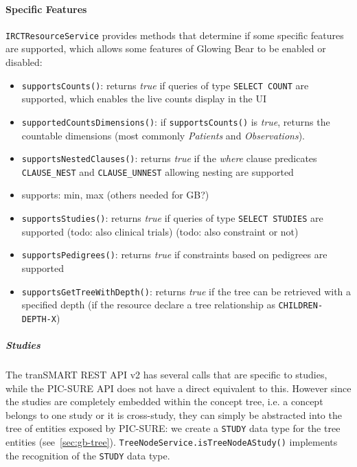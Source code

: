\paragraph{Specific Features}
\verb|IRCTResourceService| provides methods that determine if some specific features are supported, which allows some features of Glowing Bear to be enabled or disabled:
\begin{itemize}
    \item \verb|supportsCounts()|: returns \emph{true} if queries of type \verb|SELECT COUNT| are supported, which enables the live counts display in the UI
    \item \verb|supportedCountsDimensions()|: if \verb|supportsCounts()| is \emph{true}, returns the countable dimensions (most commonly \emph{Patients} and \emph{Observations}).
    \item \verb|supportsNestedClauses()|: returns \emph{true} if the \emph{where} clause predicates \verb|CLAUSE_NEST| and \verb|CLAUSE_UNNEST| allowing nesting are supported
    \item \verb|| supports: min, max (others needed for GB?)
    \item \verb|supportsStudies()|: returns \emph{true} if queries of type \verb|SELECT STUDIES| are supported (todo: also clinical trials) (todo: also constraint or not)
    \item \verb|supportsPedigrees()|: returns \emph{true} if constraints based on pedigrees are supported
    \item \verb|supportsGetTreeWithDepth()|: returns \emph{true} if the tree can be retrieved with a specified depth (if the resource declare a tree relationship as \verb|CHILDREN-DEPTH-X|)
\end{itemize}



\subparagraph{Studies}

The tranSMART REST API v2 has several calls that are specific to studies, while the PIC-SURE API does not have a direct equivalent to this.
However since the studies are completely embedded within the concept tree, i.e. a concept belongs to one study or it is cross-study, they can simply be abstracted into the tree of entities exposed by PIC-SURE: we create a \verb|STUDY| data type for the tree entities (see~\ref{sec:gb-tree}).
\verb|TreeNodeService.isTreeNodeAStudy()| implements the recognition of the \verb|STUDY| data type.

